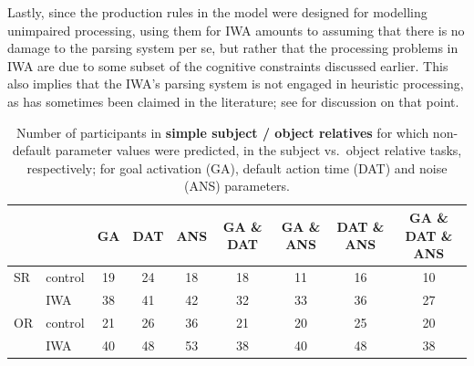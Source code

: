 \documentclass[10pt,letterpaper]{article}
\begin{document}
Lastly, since the production rules in the model were designed for modelling unimpaired processing, using them for IWA amounts to assuming that there is no damage to the parsing system per se, but rather that the processing problems in IWA are due to some subset of the cognitive constraints discussed earlier. 
This also implies that the IWA's parsing system is not engaged in heuristic processing, as has sometimes been claimed in the literature; see  for discussion on that point.

\begin{table}[htpb!]
  \centering
  \begin{tabular}{llccccccc}
    ~  & ~        & GA & DAT & ANS & GA \& DAT & GA \& ANS & DAT \& ANS & GA \& DAT \& ANS\\
    \hline
    SR & control  & 19 & 24  & 18  & 18     & 11     & 16      & 10\\
    ~  & IWA      & 38 & 41  & 42  & 32     & 33     & 36      & 27\\
    \hline
    OR & control  & 21 & 26  & 36  & 21     & 20     & 25      & 20\\
    ~  & IWA      & 40 & 48  & 53  & 38     & 40     & 48      & 38\\
    \hline
  \end{tabular}
  \caption{Number of participants in \textbf{simple subject / object relatives} for which non-default parameter values were predicted, in the subject vs.\ object relative tasks, respectively; for goal activation (GA), default action time (DAT) and noise (ANS) parameters.}
  \label{table:normsettingsSO}
\end{table}
\end{document}
